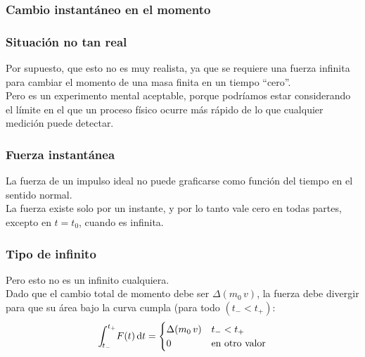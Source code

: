 \documentclass[12pt]{beamer}
\begin{document}
\begin{frame}
\frametitle{Cambio instantáneo en el momento}
\begin{figure}[H]
    \centering
{}
\end{figure}    
\end{frame}
\begin{frame}
\frametitle{Situación no tan real}
Por supuesto, que esto no es muy realista, ya que se requiere una fuerza infinita para cambiar el momento de una masa finita en un tiempo \enquote{cero}.
\\
\bigskip
\pause
Pero es un experimento mental aceptable, porque podríamos estar considerando el límite en el que un proceso físico ocurre más rápido de lo que cualquier medición puede detectar.
\end{frame}
\begin{frame}
\frametitle{Fuerza instantánea}
La fuerza de un impulso ideal no puede graficarse como función del tiempo en el sentido normal.
\\
\bigskip
\pause
La fuerza existe solo por un instante, y por lo tanto vale cero en todas partes, excepto en $t = t_{0}$, cuando es infinita. 
\end{frame}
\begin{frame}
\frametitle{Tipo de infinito}
Pero esto no es un infinito cualquiera.
\\
\bigskip
\pause
Dado que el cambio total de momento debe ser $\Delta (m_{0} \, v)$, la fuerza debe divergir para que su área bajo la curva cumpla (para todo $(t_{-} < t_{+})$:
\pause
\begin{align}
\scaleint{5ex}_{\bs t_{-}}^{t_{+}} F(t) \dd{t} = \begin{cases}
\Delta (m_{0} \, v) & t_{-} < t_{+} \\
0 & \mbox{en otro valor}
\end{cases}
\label{eq:ecuacion_05_02}
\end{align}
\end{frame}
\end{document}
